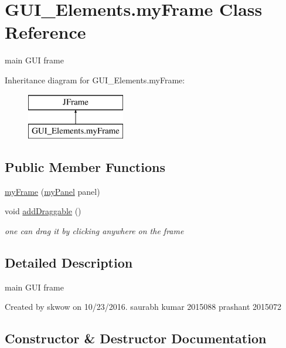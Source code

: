 \hypertarget{class_g_u_i___elements_1_1my_frame}{}\section{G\+U\+I\+\_\+\+Elements.\+my\+Frame Class Reference}
\label{class_g_u_i___elements_1_1my_frame}


main G\+UI frame  


Inheritance diagram for G\+U\+I\+\_\+\+Elements.\+my\+Frame\+:\begin{figure}[H]
\begin{center}
\leavevmode
\includegraphics[height=2.000000cm]{class_g_u_i___elements_1_1my_frame}
\end{center}
\end{figure}
\subsection*{Public Member Functions}
\begin{DoxyCompactItemize}
\item 
\hyperlink{class_g_u_i___elements_1_1my_frame_aa440e02a2f616477910624372b55f2fb}{my\+Frame} (\hyperlink{class_g_u_i___elements_1_1my_panel}{my\+Panel} panel)
\item 
void \hyperlink{class_g_u_i___elements_1_1my_frame_a5f5da5b4e114c7aff38f3b4b361bf483}{add\+Draggable} ()
\begin{DoxyCompactList}\small\item\em one can drag it by clicking anywhere on the frame \end{DoxyCompactList}\end{DoxyCompactItemize}


\subsection{Detailed Description}
main G\+UI frame 

Created by skwow on 10/23/2016. saurabh kumar 2015088 prashant 2015072 

\subsection{Constructor \& Destructor Documentation}
\hypertarget{class_g_u_i___elements_1_1my_frame_aa440e02a2f616477910624372b55f2fb}{}\label{class_g_u_i___elements_1_1my_frame_aa440e02a2f616477910624372b55f2fb} 

